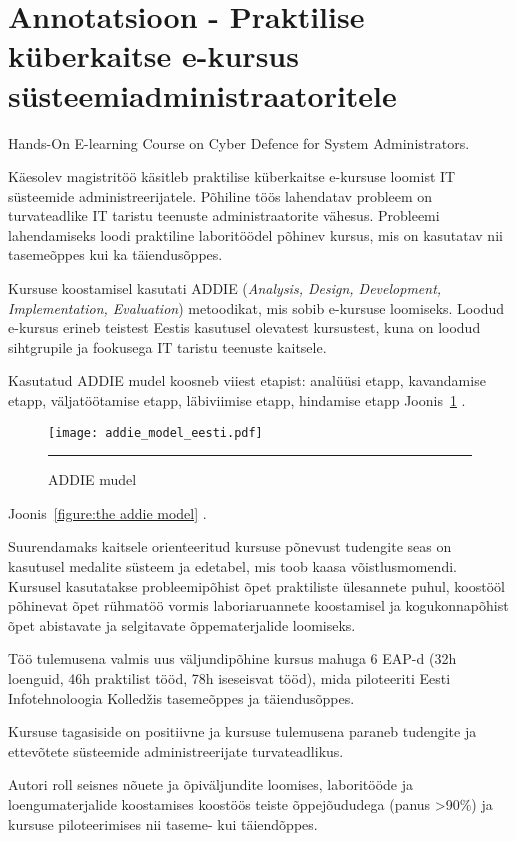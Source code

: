 \clearpage
\section*{Annotatsioon - Praktilise küberkaitse e-kursus
süsteemiadministraatoritele}
\label{kokkuvõte}
\thispagestyle{empty}
\begin{Huge}
Hands-On E-learning Course on Cyber Defence for System Administrators.\par
\end{Huge}

Käesolev magistritöö käsitleb praktilise küberkaitse e-kursuse loomist IT süsteemide administreerijatele. Põhiline töös lahendatav probleem on turvateadlike IT taristu teenuste administraatorite vähesus. Probleemi lahendamiseks loodi praktiline laboritöödel põhinev kursus, mis on kasutatav nii tasemeõppes kui ka täiendusõppes.

Kursuse koostamisel kasutati \gls{ADDIE} (\emph{Analysis, Design, Development, Implementation, Evaluation}) metoodikat, mis sobib e-kursuse loomiseks. Loodud e-kursus erineb teistest Eestis kasutusel olevatest kursustest, kuna on loodud sihtgrupile ja fookusega IT taristu teenuste kaitsele.

Kasutatud \gls{ADDIE} mudel koosneb viiest etapist: analüüsi etapp, kavandamise etapp, väljatöötamise etapp, läbiviimise etapp, hindamise etapp  Joonis~\ref{figure:addie mudel} \citep{website:addie}.


\begin{figure}[H]
 \centering 
 \texttt{[image: addie\_model\_eesti.pdf]}
 \rule{35em}{0.5pt} 
 \caption{ADDIE mudel} 
 \label{figure:addie mudel} 
\end{figure}
 Joonis~\ref{figure:the addie model} \citep{website:addie}.



Suurendamaks kaitsele orienteeritud kursuse põnevust tudengite seas on kasutusel medalite süsteem ja edetabel, mis toob kaasa võistlusmomendi. Kursusel kasutatakse probleemipõhist õpet praktiliste ülesannete puhul, koostööl põhinevat õpet rühmatöö vormis laboriaruannete  koostamisel ja kogukonnapõhist õpet abistavate ja selgitavate õppematerjalide loomiseks.

Töö tulemusena valmis uus väljundipõhine kursus mahuga 6 EAP-d (32h loenguid, 46h praktilist tööd, 78h iseseisvat tööd), mida piloteeriti Eesti Infotehnoloogia Kolledžis tasemeõppes ja täiendusõppes. %

Kursuse tagasiside on positiivne ja kursuse tulemusena paraneb tudengite ja ettevõtete süsteemide administreerijate turvateadlikus.

Autori roll seisnes nõuete ja õpiväljundite loomises, laboritööde ja loengumaterjalide koostamises koostöös teiste õppejõududega (panus >90\%) ja kursuse piloteerimises nii taseme- kui täiendõppes.
